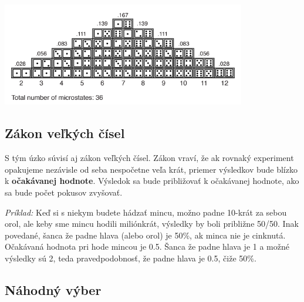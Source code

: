 \documentclass[]{article}
\begin{document}
\begin{center}

\includegraphics[width=0.8\textwidth,height=\textheight]{diplomka obrazky/5.png}

\end{center}

\hypertarget{zuxe1kon-veux13ekuxfdch-ux10duxedsel}{%
\subsection{Zákon veľkých
čísel}\label{zuxe1kon-veux13ekuxfdch-ux10duxedsel}}

S tým úzko súvisí aj zákon veľkých čísel. Zákon vraví, že ak rovnaký
experiment opakujeme nezávisle od seba nespočetne veľa krát, priemer
výsledkov bude blízko k \textbf{očakávanej hodnote}. Výsledok sa bude
približovať k očakávanej hodnote, ako sa bude počet pokusov zvyšovať.

\emph{Príklad:} Keď si s niekym budete hádzať mincu, možno padne 10-krát
za sebou orol, ale keby sme mincu hodili miliónkrát, výsledky by boli
približne 50/50. Inak povedané, šanca že padne hlava (alebo orol) je
50\%, ak minca nie je cinknutá. Očakávaná hodnota pri hode mincou je
0.5. Šanca že padne hlava je 1 a možné výsledky sú 2, teda
pravedpodobnosť, že padne hlava je 0.5, čiže 50\%.

\hypertarget{nuxe1hodnuxfd-vuxfdber}{%
\subsection{Náhodný výber}\label{nuxe1hodnuxfd-vuxfdber}}
\end{document}
